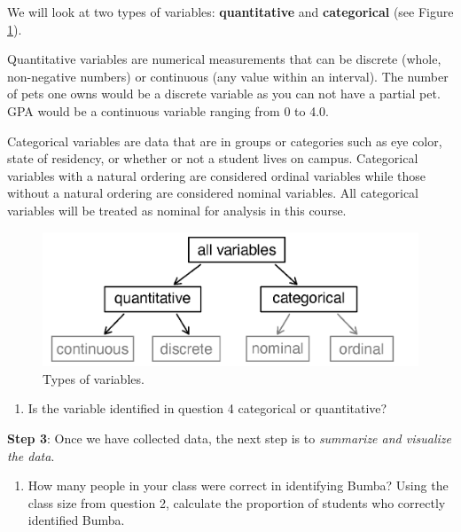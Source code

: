 \documentclass[
]{report}
\providecommand{\tightlist}{%
  \setlength{\itemsep}{0pt}\setlength{\parskip}{0pt}}
\begin{document}
\vspace{.8in}

We will look at two types of variables: \textbf{quantitative} and \textbf{categorical} (see Figure \ref{fig:types-of-variables}).

Quantitative variables are numerical measurements that can be discrete (whole, non-negative numbers) or continuous (any value within an interval). The number of pets one owns would be a discrete variable as you can not have a partial pet. GPA would be a continuous variable ranging from 0 to 4.0.

Categorical variables are data that are in groups or categories such as eye color, state of residency, or whether or not a student lives on campus. Categorical variables with a natural ordering are considered ordinal variables while those without a natural ordering are considered nominal variables. All categorical variables will be treated as nominal for analysis in this course.

\begin{figure}

{\centering \includegraphics[width=0.6\linewidth]{images/variables} 

}

\caption{Types of variables.}\label{fig:types-of-variables}
\end{figure}

\begin{enumerate}
\def\labelenumi{\arabic{enumi}.}
\setcounter{enumi}{4}
\tightlist
\item
  Is the variable identified in question 4 categorical or quantitative?
\end{enumerate}

\vspace{0.3in}

\newpage

\textbf{Step 3}: Once we have collected data, the next step is to \emph{summarize and visualize the data}.

\begin{enumerate}
\def\labelenumi{\arabic{enumi}.}
\setcounter{enumi}{5}
\tightlist
\item
  How many people in your class were correct in identifying Bumba? Using the class size from question 2, calculate the proportion of students who correctly identified Bumba.
\end{enumerate}
\end{document}
